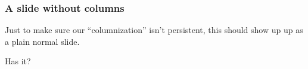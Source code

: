 \documentclass[t,english]{beamer}
\begin{document}
\begin{frame}
\frametitle{A slide without columns}


Just to make sure our ``columnization'' isn't persistent, this should show up
up as a plain normal slide.

Has it?
\end{frame}
\end{document}
